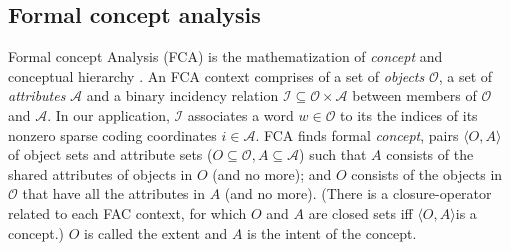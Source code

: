 \documentclass[11pt,a4paper]{article}
\begin{document}

\subsection{Formal concept analysis}

\newcommand{\ob}{\ensuremath{\mathcal O}}
\newcommand{\at}{\ensuremath{\mathcal A}}
\newcommand{\inci}{\ensuremath{\mathcal I}}
\newcommand{\oaconc}{\ensuremath{\langle O, A\rangle}}

Formal concept Analysis (FCA) is the mathematization of \emph{concept} and conceptual
hierarchy \citep{Ganter:2012,Endres:2010}. %
An FCA context %
comprises of
a set of \emph{objects} $\ob$, a set of \emph{attributes} $\at$ and
a binary incidency relation $\inci \subseteq \ob \times \at$
between members of \ob and \at.
In our application, $\inci$ associates a word $w\in\ob$ to its
the indices of its nonzero sparse coding coordinates $i\in\at$.
FCA finds formal \emph{concept}, pairs \oaconc of object sets and attribute sets
($O\subseteq \ob,A \subseteq \at$) such that $A$
consists of the shared attributes of objects in $O$ (and no more); and
$O$ consists of
the objects in $\ob$ that have all the attributes in $A$ (and no more).
(There is a closure-operator related to each FAC context, for which $O$ and $A$
are closed sets iff \oaconc is a concept.)
$O$ is called the extent and $A$ is the intent of the concept.
\end{document}
